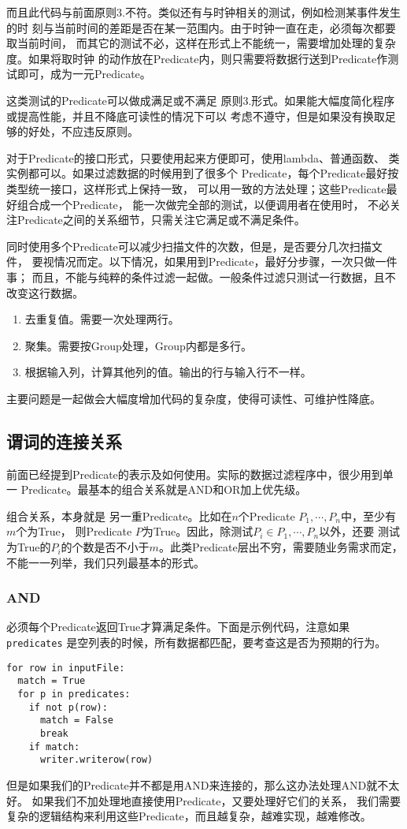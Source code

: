 \documentclass[11pt]{article}
\newcommand{\id}[1]{\texttt{#1}}
\begin{document}
而且此代码与前面原则3.不符。类似还有与时钟相关的测试，例如检测某事件发生的时
刻与当前时间的差距是否在某一范围内。由于时钟一直在走，必须每次都要取当前时间，
而其它的测试不必，这样在形式上不能统一，需要增加处理的复杂度。如果将取时钟
的动作放在Predicate内，则只需要将数据行送到Predicate作测试即可，成为一元Predicate。

这类测试的Predicate可以做成满足或不满足
原则3.形式。如果能大幅度简化程序或提高性能，并且不降底可读性的情况下可以
考虑不遵守，但是如果没有换取足够的好处，不应违反原则。

对于Predicate的接口形式，只要使用起来方便即可，使用lambda、普通函数、
类实例都可以。如果过滤数据的时候用到了很多个
Predicate，每个Predicate最好按类型统一接口，这样形式上保持一致，
可以用一致的方法处理；这些Predicate最好组合成一个Predicate，
能一次做完全部的测试，以便调用者在使用时，
不必关注Predicate之间的关系细节，只需关注它满足或不满足条件。

同时使用多个Predicate可以减少扫描文件的次数，但是，是否要分几次扫描文件，
要视情况而定。以下情况，如果用到Predicate，最好分步骤，一次只做一件事；
而且，不能与纯粹的条件过滤一起做。一般条件过滤只测试一行数据，且不改变这行数据。

\begin{enumerate}
  \item 去重复值。需要一次处理两行。
  \item 聚集。需要按Group处理，Group内都是多行。
  \item 根据输入列，计算其他列的值。输出的行与输入行不一样。
\end{enumerate}

主要问题是一起做会大幅度增加代码的复杂度，使得可读性、可维护性降底。


\subsection{谓词的连接关系}
前面已经提到Predicate的表示及如何使用。实际的数据过滤程序中，很少用到单一
Predicate。最基本的组合关系就是AND和OR加上优先级。

组合关系，本身就是
另一重Predicate。比如在$n$个Predicate $P_1, \cdots, P_n$中，至少有$m$个为True，
则Predicate $P$为True。因此，除测试$P_i \in {P_1, \cdots, P_n}$以外，还要
测试为True的$P_i$的个数是否不小于$m$。此类Predicate层出不穷，需要随业务需求而定，
不能一一列举，我们只列最基本的形式。

\subsubsection{AND}
必须每个Predicate返回True才算满足条件。下面是示例代码，注意如果\id{predicates}
是空列表的时候，所有数据都匹配，要考查这是否为预期的行为。
\begin{lstlisting}
for row in inputFile:
  match = True
  for p in predicates:
    if not p(row):
      match = False
      break
    if match:
      writer.writerow(row)
\end{lstlisting}
但是如果我们的Predicate并不都是用AND来连接的，那么这办法处理AND就不太好。
如果我们不加处理地直接使用Predicate，又要处理好它们的关系，
我们需要复杂的逻辑结构来利用这些Predicate，而且越复杂，越难实现，越难修改。
\end{document}

